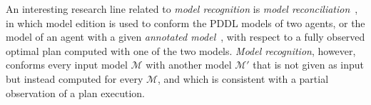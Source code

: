 \documentclass[letterpaper]{article} %
\newcommand{\strips}{\textsc{Strips}}     %
\begin{document}
An interesting research line related to {\em model recognition} is {\em model reconciliation}~\cite{ChakrabortiSZK17}, in which model edition is used to conform the PDDL models of two agents, or the model of an agent with a given {\em annotated model}~\cite{sreedharan2018handling}, with respect to a fully observed optimal plan computed with one of the two models. {\em Model recognition}, however, conforms every input model $\mathcal{M}$ with another model $\mathcal{M}'$ that is not given as input but instead computed for every $\mathcal{M}$, and which is consistent with a partial observation of a plan execution.
















\newpage



\end{document}
